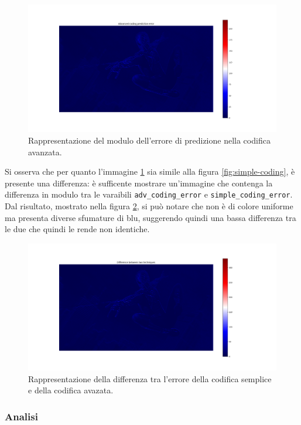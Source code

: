 \begin{figure}[h]
    \centering
    \includegraphics[width = .9\textwidth]{hw-1/report/imgs/advanced-coding.png}
    \caption{Rappresentazione del modulo dell'errore di predizione nella codifica avanzata.}
    \label{fig:advanced-coding}
\end{figure}

\FloatBarrier\noindent Si osserva che per quanto l'immagine \ref{fig:advanced-coding} sia simile alla figura \ref{fig:simple-coding}, è presente una differenza: è sufficente mostrare un'immagine che contenga la differenza in modulo tra le varaibili \texttt{adv\_coding\_error} e \texttt{simple\_coding\_error}. Dal risultato, mostrato nella figura \ref{fig:error-difference}, si può notare che non è di colore uniforme ma presenta diverse sfumature di blu, suggerendo quindi una bassa differenza tra le due che quindi le rende non identiche.

\begin{figure}[h]
    \centering
    \includegraphics[width = .9\textwidth]{hw-1/report/imgs/error-difference.png}
    \caption{Rappresentazione della differenza tra l'errore della codifica semplice e della codifica avazata.}
    \label{fig:error-difference}
\end{figure}



\subsubsection{Analisi}

